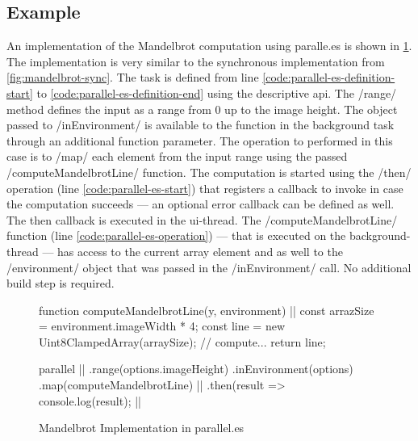 \subsection{Example}
An implementation of the Mandelbrot computation using paralle.es is shown in \cref{code:mandelbrot-parallel.es}. The implementation is very similar to the synchronous implementation from \cref{fig:mandelbrot-sync}. The task is defined from line \ref{code:parallel-es-definition-start} to \ref{code:parallel-es-definition-end} using the descriptive api. The \javascriptinline/range/ method defines the input as a range from 0 up to the image height. The object passed to \javascriptinline/inEnvironment/ is available to the function in the background task through an additional function parameter. The operation to performed in this case is to \javascriptinline/map/ each element from the input range using the passed \javascriptinline/computeMandelbrotLine/ function. The computation is started using the \javascriptinline/then/ operation (line \ref{code:parallel-es-start}) that registers a callback to invoke in case the computation succeeds --- an optional error callback can be defined as well. The then callback is executed in the ui-thread. The \javascriptinline/computeMandelbrotLine/ function (line \ref{code:parallel-es-operation}) --- that is executed on the background-thread --- has access to the current array element and as well to the \javascriptinline/environment/ object that was passed in the \javascriptinline/inEnvironment/ call. No additional build step is required.


\begin{figure}
	\begin{javascriptcode}
function computeMandelbrotLine(y, environment) { |$\label{code:parallel-es-operation}$|
	const arrazSize = environment.imageWidth * 4;
	const line = new Uint8ClampedArray(arraySize);
	// compute...
	return line;
}

parallel      |$\label{code:parallel-es-definition-start}$|
	.range(options.imageHeight)
	.inEnvironment(options)
	.map(computeMandelbrotLine) |$\label{code:parallel-es-definition-end}$|
	.then(result => console.log(result); |$\label{code:parallel-es-start}$|
	\end{javascriptcode}
	
	\caption{Mandelbrot Implementation in parallel.es}
	\label{code:mandelbrot-parallel.es}
\end{figure}

